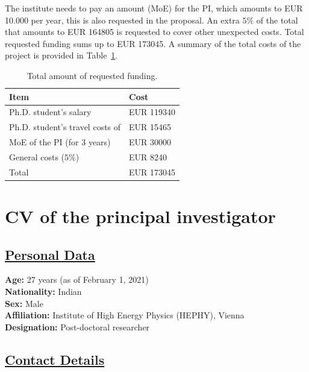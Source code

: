 \documentclass[a4paper,11pt]{article}
\begin{document}
{The institute needs to pay an amount (MoE) for the PI, which amounts to EUR 10.000 per year, 
this is also requested in the proposal.
An extra $5\%$ of the total that amounts to EUR 164805 is requested to cover other unexpected costs.  
Total requested funding sums up to EUR 173045.  
A summary of the total costs of the project is provided in Table~\ref{Tab:Total_cost}.
\begin{table}
\caption{Total amount of requested funding.}
\begin{tabular}{m{6 cm}| m{4 cm}}
Item & Cost  \\
\hline 
Ph.D. student's salary & EUR 119340  \\
Ph.D. student's travel costs of & EUR 15465 \\
MoE of the PI (for 3 years) & EUR 30000 \\
\hline
General costs ($5\%$) & EUR 8240  \\
\hline
Total & EUR 173045 
\end{tabular}
\label{Tab:Total_cost}
\end{table}

\newpage


\section{CV of the principal investigator}

\subsection*{\underline{Personal Data}}

\textbf{Age:} 27 years (as of February 1, 2021)\\
\textbf{Nationality:} Indian \\
\textbf{Sex:} Male \\
\textbf{Affiliation:} Institute of High Energy Physics (HEPHY), Vienna \\
\textbf{Designation:} Post-doctoral researcher 


\subsection*{\underline{Contact Details}}

}
\end{document}
